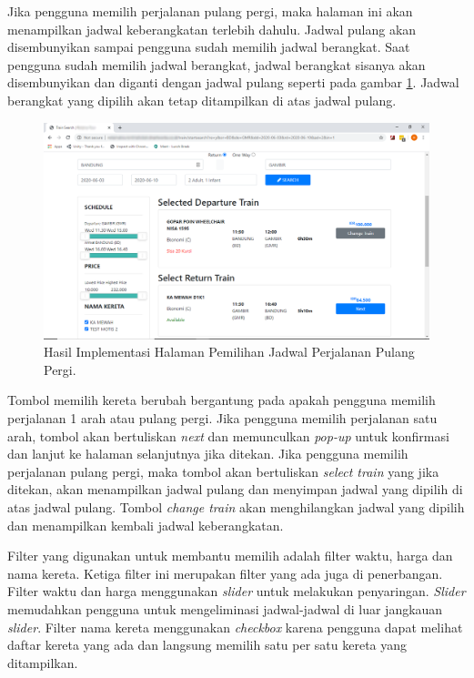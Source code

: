 Jika pengguna memilih perjalanan pulang pergi, maka halaman ini akan menampilkan jadwal keberangkatan terlebih dahulu. Jadwal pulang akan disembunyikan sampai pengguna sudah memilih jadwal berangkat. Saat pengguna sudah memilih jadwal berangkat, jadwal berangkat sisanya akan disembunyikan dan diganti dengan jadwal pulang seperti pada gambar \ref{img:implementasijadwalpulang}. Jadwal berangkat yang dipilih akan tetap ditampilkan di atas jadwal pulang.

\begin{figure}[H]
        \center
        \includegraphics[width=\textwidth,height=\textheight,keepaspectratio]{Gambar/Search result pilih jadwal pulang.png}
        \caption{Hasil Implementasi Halaman Pemilihan Jadwal Perjalanan Pulang Pergi.}
            \label{img:implementasijadwalpulang}
        \end{figure}

Tombol memilih kereta berubah bergantung pada apakah pengguna memilih perjalanan 1 arah atau pulang pergi. Jika pengguna memilih perjalanan satu arah, tombol akan bertuliskan \textit{next} dan memunculkan \textit{pop-up} untuk konfirmasi dan lanjut ke halaman selanjutnya jika ditekan. Jika pengguna memilih perjalanan pulang pergi, maka tombol akan bertuliskan \textit{select train} yang jika ditekan, akan menampilkan jadwal pulang dan menyimpan jadwal yang dipilih di atas jadwal pulang. Tombol \textit{change train} akan menghilangkan jadwal yang dipilih dan menampilkan kembali jadwal keberangkatan.

Filter yang digunakan untuk membantu memilih adalah filter waktu, harga dan nama kereta. Ketiga filter ini merupakan filter yang ada juga di penerbangan. Filter waktu dan harga menggunakan \textit{slider} untuk melakukan penyaringan. \textit{Slider} memudahkan pengguna untuk mengeliminasi jadwal-jadwal di luar jangkauan \textit{slider}. Filter nama kereta menggunakan \textit{checkbox} karena pengguna dapat melihat daftar kereta yang ada dan langsung memilih satu per satu kereta yang ditampilkan.

